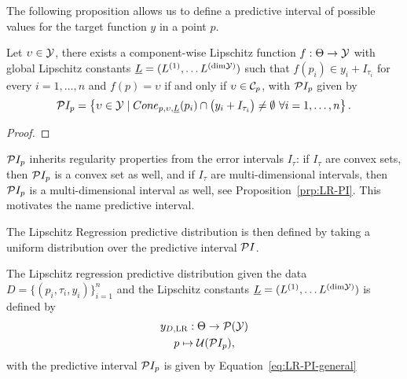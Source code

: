 The following proposition allows us to define a predictive interval of possible values for the target function $y$ in a point $p$.
\begin{prp}
    Let $\upsilon \in \mathcal Y$, there exists a component-wise Lipschitz function $f: \Theta \rightarrow \mathcal Y$ with global Lipschitz constants $\underline L = (L^{(1)},\dots L^{(\text{dim}\mathcal Y)} )$ such that $f(p_i) \in y_i + I_{\tau_i}$ for every $i = 1, \dots, n$ and $f(p) = \upsilon$ if and only if $\upsilon \in \mathcal C_p$, with $\mathcal PI_p$ given by
    \begin{equation}\label{eq:LR-PI-general}
        \mathcal PI_p = \left \{ \upsilon \in \mathcal Y \mid Cone_{p,\upsilon,\underline L}(p_i) \cap  \big ( y_i + I_{\tau_i} \big ) \neq \emptyset \ \forall i = 1, \dots, n \right \}.
    \end{equation}
\end{prp}
\begin{proof}
\end{proof}
\begin{rmk}
    $\mathcal PI_p$ inherits regularity properties from the error intervals $I_\tau$: if $I_\tau$ are convex sets, then $\mathcal PI_p$ is a convex set as well, and if $I_\tau$ are multi-dimensional intervals, then $\mathcal PI_p$ is a multi-dimensional interval as well, see Proposition~\ref{prp:LR-PI}. 
    This motivates the name predictive interval. 
\end{rmk}

The Lipschitz Regression predictive distribution is then defined by taking a uniform distribution over the predictive interval $\mathcal P I$.
\begin{dfn}  \label{dfn:LR}
    The Lipschitz regression predictive distribution given the data $D=\{ (p_i, \tau_i, y_i) \}_{i=1}^n$ and the Lipschitz constants $\underline{L} = (L^{(1)},\dots L^{(\text{dim}\mathcal Y)})$ is defined by
    \begin{gather*}
        y_{D, \text{LR}} : \Theta \rightarrow \mathcal P( \mathcal Y) \\
        p \mapsto \mathcal U( \mathcal PI_p ),
    \end{gather*}
    with the predictive interval $\mathcal PI_p$ is given by Equation~\eqref{eq:LR-PI-general}
\end{dfn}

